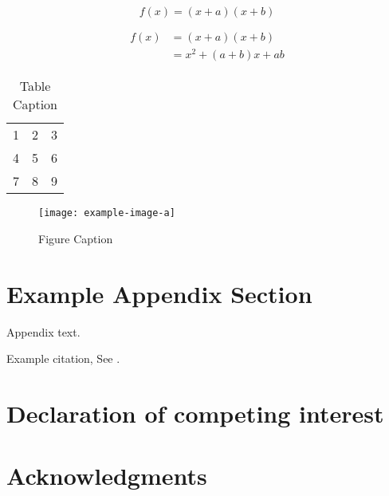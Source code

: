 \documentclass[final,5p,times,twocolumn,authoryear]{elsarticle}
\begin{document}
\begin{equation}
f(x) = (x+a)(x+b)
\end{equation}

\begin{align}
 f(x) &= (x+a)(x+b) \\
      &= x^2 + (a+b)x + ab
\end{align}



\begin{table}[htbp]
\centering
\begin{tabular}{l c r}
  1 & 2 & 3 \\ 
  4 & 5 & 6 \\
  7 & 8 & 9 \\
\end{tabular}
\caption{Table Caption}
\label{tab1}
\end{table}


\begin{figure}[t]
\centering
\texttt{[image: example-image-a]}
\caption{Figure Caption}\label{fig1}
\end{figure}

\appendix
\section{Example Appendix Section}
\label{app1}

Appendix text.

Example citation, See \cite{chang2014delineation}.

\section*{Declaration of competing interest}


\section*{Acknowledgments}



\end{document}
